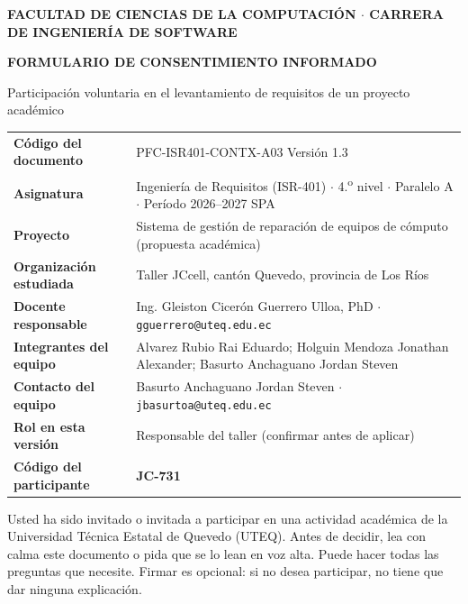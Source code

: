 
\begin{center}
  {\small\bfseries FACULTAD DE CIENCIAS DE LA COMPUTACI\'ON $\cdot$ CARRERA DE INGENIER\'IA DE SOFTWARE\par}
  \vspace{0.1cm}
  {\large\bfseries FORMULARIO DE CONSENTIMIENTO INFORMADO\par}
  {\small Participaci\'on voluntaria en el levantamiento de requisitos de un proyecto acad\'emico\par}
\end{center}

\noindent\begin{tabularx}{\linewidth}{@{}L{4.2cm}Y@{}}
  \toprule
  \textbf{C\'odigo del documento} & PFC-ISR401-CONTX-A03 \quad Versi\'on 1.3 \\
  \textbf{Asignatura} & Ingenier\'ia de Requisitos (ISR-401) $\cdot$ 4.\textsuperscript{o} nivel $\cdot$ Paralelo A $\cdot$ Per\'iodo 2026--2027 SPA \\
  \textbf{Proyecto} & Sistema de gesti\'on de reparaci\'on de equipos de c\'omputo (propuesta acad\'emica) \\
  \textbf{Organizaci\'on estudiada} & Taller JC\textbar{}cell, cant\'on Quevedo, provincia de Los R\'ios \\
  \textbf{Docente responsable} & Ing. Gleiston Cicer\'on Guerrero Ulloa, PhD $\cdot$ \texttt{gguerrero@uteq.edu.ec} \\
  \textbf{Integrantes del equipo} & Alvarez Rubio Rai Eduardo; Holguin Mendoza Jonathan Alexander; Basurto Anchaguano Jordan Steven \\
  \textbf{Contacto del equipo} & Basurto Anchaguano Jordan Steven $\cdot$ \texttt{jbasurtoa@uteq.edu.ec} \\
  \textbf{Rol en esta versi\'on} & Responsable del taller (confirmar antes de aplicar) \\
  \textbf{C\'odigo del participante} & \textbf{JC-731} \\
  \bottomrule
\end{tabularx}

\medskip
Usted ha sido invitado o invitada a participar en una actividad acad\'emica de la Universidad
T\'ecnica Estatal de Quevedo (UTEQ). Antes de decidir, lea con calma este documento o pida que se
lo lean en voz alta. Puede hacer todas las preguntas que necesite. Firmar es opcional: si no desea
participar, no tiene que dar ninguna explicaci\'on.

